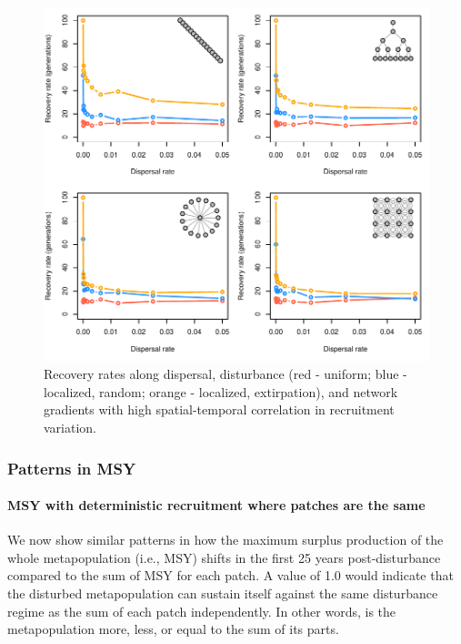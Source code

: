 \documentclass[
]{article}
\begin{document}
\begin{figure}[H]

{\centering \includegraphics{Managing_for_ecological_surprises_in_metapopulations_files/figure-latex/spatiotemporal correlation-1} 

}

\caption{Recovery rates along dispersal, disturbance (red - uniform; blue - localized, random; orange - localized, extirpation), and network gradients with high spatial-temporal correlation in recruitment variation.}\label{fig:spatiotemporal correlation}
\end{figure}
\newpage

\hypertarget{patterns-in-msy}{%
\subsubsection{Patterns in MSY}\label{patterns-in-msy}}

\hypertarget{msy-with-deterministic-recruitment-where-patches-are-the-same}{%
\paragraph{MSY with deterministic recruitment where patches are the
same}\label{msy-with-deterministic-recruitment-where-patches-are-the-same}}

We now show similar patterns in how the maximum surplus production of
the whole metapopulation (i.e., MSY) shifts in the first 25 years
post-disturbance compared to the sum of MSY for each patch. A value of
1.0 would indicate that the disturbed metapopulation can sustain itself
against the same disturbance regime as the sum of each patch
independently. In other words, is the metapopulation more, less, or
equal to the sum of its parts.
\end{document}
